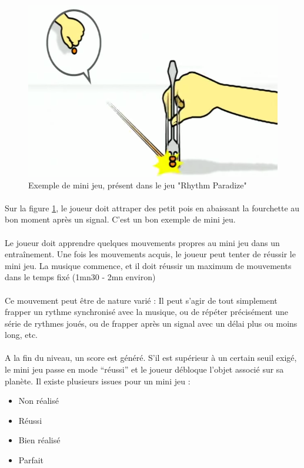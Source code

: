 \begin{figure}[H]\centering
  \includegraphics[scale=.4]{./img/rhythmParadise.png}
  \caption{Exemple de mini jeu, présent dans le jeu "Rhythm Paradize"}
  \label{rhythmParadise}
\end{figure}

\paragraph{} Sur la figure \ref{rhythmParadise}, le joueur doit attraper des petit pois en abaissant la fourchette au bon moment après un signal. C'est un bon exemple de mini jeu.

\paragraph{} Le joueur doit apprendre quelques mouvements propres au mini jeu dans un entraînement. Une fois les mouvements acquis, le joueur peut tenter de réussir le mini jeu. La musique commence, et il doit réussir un maximum de mouvements dans le temps fixé (1mn30 - 2mn environ)
\paragraph{} Ce mouvement peut être de nature varié : Il peut s’agir de tout simplement frapper un rythme synchronisé avec la musique, ou de répéter précisément une série de rythmes joués, ou de frapper après un signal avec un délai plus ou moins long, etc.



\paragraph{} A la fin du niveau, un score est généré. S’il est supérieur à un certain seuil exigé, le mini jeu passe en mode “réussi” et le joueur débloque l’objet associé sur sa planète.
Il existe plusieurs issues pour un mini jeu :
\begin{itemize}
\item Non réalisé
\item Réussi
\item Bien réalisé 
\item Parfait
\end{itemize}

